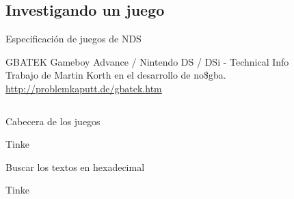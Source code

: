 \subsection{Investigando un juego}
\begin{frame}{Especificación de juegos de NDS}
    \begin{block}{GBATEK}
        \centering
         Gameboy Advance / Nintendo DS / DSi - Technical Info \\
         Trabajo de Martin Korth en el desarrollo de no\$gba.
        \url{http://problemkaputt.de/gbatek.htm}
    \end{block}
    \vfill
    \small
    \begin{columns}
    \begin{column}{0.3\textwidth}
    \end{column}
    \begin{column}{0.3\textwidth}
    \end{column}
    \begin{column}{0.3\textwidth}
    \end{column}
    \end{columns}
\end{frame}

\begin{frame}{Cabecera de los juegos}

\end{frame}

\begin{frame}{Tinke}
\end{frame}

\begin{frame}{Buscar los textos en hexadecimal}
\end{frame}

\begin{frame}{Tinke}
\end{frame}

